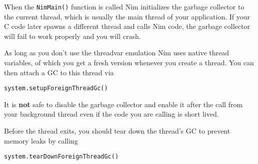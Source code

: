 When the \texttt{NimMain()} function is called Nim initializes the
garbage collector to the current thread, which is usually the main
thread of your application. If your C code later spawns a different
thread and calls Nim code, the garbage collector will fail to work
properly and you will crash.

As long as you don't use the threadvar emulation Nim uses native thread
variables, of which you get a fresh version whenever you create a
thread. You can then attach a GC to this thread via

\begin{verbatim}
system.setupForeignThreadGc()
\end{verbatim}

It is \textbf{not} safe to disable the garbage collector and enable it
after the call from your background thread even if the code you are
calling is short lived.

Before the thread exits, you should tear down the thread's GC to prevent
memory leaks by calling

\begin{verbatim}
system.tearDownForeignThreadGc()
\end{verbatim}
